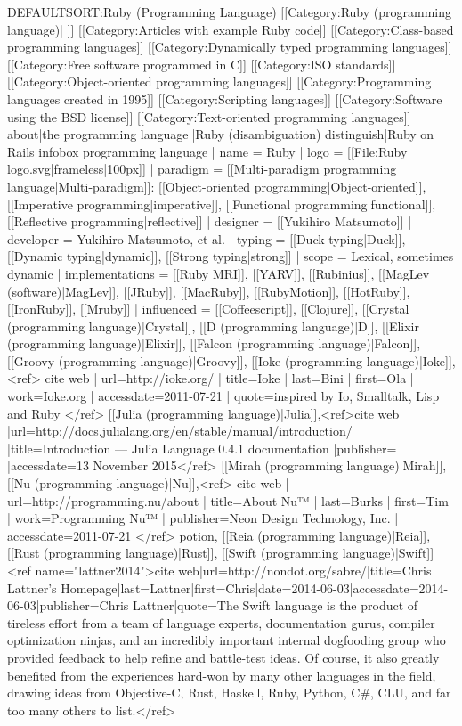 {{DEFAULTSORT:Ruby (Programming Language)}}
[[Category:Ruby (programming language)| ]]
[[Category:Articles with example Ruby code]]
[[Category:Class-based programming languages]]
[[Category:Dynamically typed programming languages]]
[[Category:Free software programmed in C]]
[[Category:ISO standards]]
[[Category:Object-oriented programming languages]]
[[Category:Programming languages created in 1995]]
[[Category:Scripting languages]]
[[Category:Software using the BSD license]]
[[Category:Text-oriented programming languages]]
{{about|the programming language||Ruby (disambiguation)}}
{{distinguish|Ruby on Rails}}
{{infobox programming language
 | name                   = Ruby
 | logo                   = [[File:Ruby logo.svg|frameless|100px]]
 | paradigm               = [[Multi-paradigm programming language|Multi-paradigm]]: [[Object-oriented programming|Object-oriented]], [[Imperative programming|imperative]], [[Functional programming|functional]], [[Reflective programming|reflective]]
 | designer               = [[Yukihiro Matsumoto]]
 | developer              = Yukihiro Matsumoto, et al.
 | typing                 = [[Duck typing|Duck]], [[Dynamic typing|dynamic]], [[Strong typing|strong]]
 | scope                  = Lexical, sometimes dynamic
 | implementations        = [[Ruby MRI]], [[YARV]], [[Rubinius]], [[MagLev (software)|MagLev]], [[JRuby]], [[MacRuby]], [[RubyMotion]], [[HotRuby]], [[IronRuby]], [[Mruby]]
| influenced              = [[Coffeescript]], [[Clojure]], [[Crystal (programming language)|Crystal]], [[D (programming language)|D]], [[Elixir (programming language)|Elixir]], [[Falcon (programming language)|Falcon]], [[Groovy (programming language)|Groovy]], [[Ioke (programming language)|Ioke]],<ref>
{{cite web
   | url=http://ioke.org/
   | title=Ioke
   | last=Bini
   | first=Ola
   | work=Ioke.org
   | accessdate=2011-07-21
   | quote=inspired by Io, Smalltalk, Lisp and Ruby}}
</ref> [[Julia (programming language)|Julia]],<ref>{{cite web |url=http://docs.julialang.org/en/stable/manual/introduction/ |title=Introduction — Julia Language 0.4.1 documentation |publisher= |accessdate=13 November 2015}}</ref> [[Mirah (programming language)|Mirah]], [[Nu (programming language)|Nu]],<ref>
{{cite web
   | url=http://programming.nu/about
   | title=About Nu™
   | last=Burks
   | first=Tim
   | work=Programming Nu™
   | publisher=Neon Design Technology, Inc.
   | accessdate=2011-07-21}}
</ref> potion, [[Reia (programming language)|Reia]], [[Rust (programming language)|Rust]], [[Swift (programming language)|Swift]]<ref name="lattner2014">{{cite web|url=http://nondot.org/sabre/|title=Chris Lattner's Homepage|last=Lattner|first=Chris|date=2014-06-03|accessdate=2014-06-03|publisher=Chris Lattner|quote=The Swift language is the product of tireless effort from a team of language experts, documentation gurus, compiler optimization ninjas, and an incredibly important internal dogfooding group who provided feedback to help refine and battle-test ideas. Of course, it also greatly benefited from the experiences hard-won by many other languages in the field, drawing ideas from Objective-C, Rust, Haskell, Ruby, Python, C#, CLU, and far too many others to list.}}</ref>
}}
